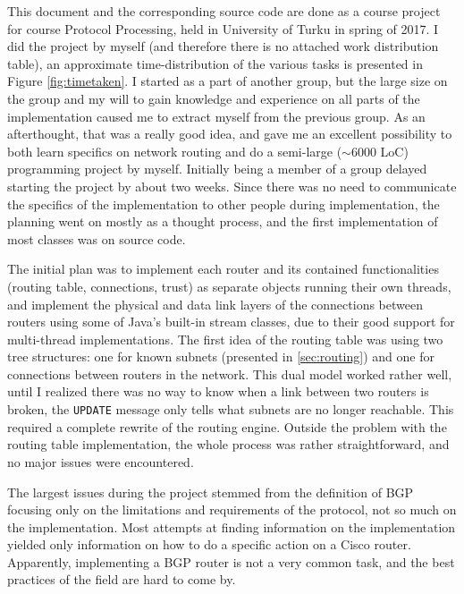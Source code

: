 \documentclass[11pt,a4paper,titlepage]{report}
\begin{document}
This document and the corresponding source code are done as a course project for course Protocol Processing, held in University of Turku in spring of 2017. I did the project by myself (and therefore there is no attached work distribution table), an approximate time-distribution of the various tasks is presented in Figure \ref{fig:timetaken}. I started as a part of another group, but the large size on the group and my will to gain knowledge and experience on all parts of the implementation caused me to extract myself from the previous group. As an afterthought, that was a really good idea, and gave me an excellent possibility to both learn specifics on network routing and do a semi-large ($\sim 6000$ LoC) programming project by myself. Initially being a member of a group delayed starting the project by about two weeks. Since there was no need to communicate the specifics of the implementation to other people during implementation, the planning went on mostly as a thought process, and the first implementation of most classes was on source code.

The initial plan was to implement each router and its contained functionalities (routing table, connections, trust) as separate objects running their own threads, and implement the physical and data link layers of the connections between routers using some of Java's built-in stream classes, due to their good support for multi-thread implementations. The first idea of the routing table was using two tree structures: one for known subnets (presented in \ref{sec:routing}) and one for connections between routers in the network. This dual model worked rather well, until I realized there was no way to know when a link between two routers is broken, the \texttt{UPDATE} message only tells what subnets are no longer reachable. This required a complete rewrite of the routing engine. Outside the problem with the routing table implementation, the whole process was rather straightforward, and no major issues were encountered.

The largest issues during the project stemmed from the definition of BGP \cite{RFC4271} focusing only on the limitations and requirements of the protocol, not so much on the implementation. Most attempts at finding information on the implementation yielded only information on how to do a specific action on a Cisco router. Apparently, implementing a BGP router is not a very common task, and the best practices of the field are hard to come by.
\end{document}

